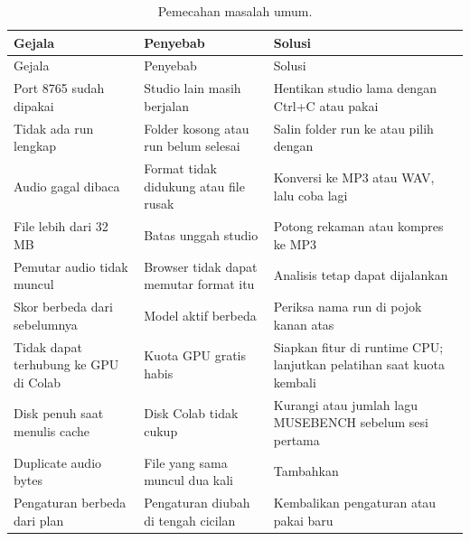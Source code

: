 {\singlespacing\small
\begin{longtable}{L{4.1cm} L{3.8cm} L{4.4cm}}
\caption{Pemecahan masalah umum.}\label{tab:masalah}\\
\toprule
Gejala & Penyebab & Solusi\\
\midrule
\endfirsthead
\toprule
Gejala & Penyebab & Solusi\\
\midrule
\endhead
\bottomrule
\endfoot
Port 8765 sudah dipakai & Studio lain masih berjalan & Hentikan studio lama dengan Ctrl+C atau pakai \\
Tidak ada run lengkap & Folder  kosong atau run belum selesai & Salin folder run ke  atau pilih dengan \\
Audio gagal dibaca & Format tidak didukung atau file rusak & Konversi ke MP3 atau WAV, lalu coba lagi\\
File lebih dari 32 MB & Batas unggah studio & Potong rekaman atau kompres ke MP3\\
Pemutar audio tidak muncul & Browser tidak dapat memutar format itu & Analisis tetap dapat dijalankan\\
Skor berbeda dari sebelumnya & Model aktif berbeda & Periksa nama run di pojok kanan atas\\
Tidak dapat terhubung ke GPU di Colab & Kuota GPU gratis habis & Siapkan fitur di runtime CPU; lanjutkan pelatihan saat kuota kembali\\
Disk penuh saat menulis cache & Disk Colab tidak cukup & Kurangi  atau jumlah lagu MUSEBENCH sebelum sesi pertama\\
Duplicate audio bytes & File yang sama muncul dua kali & Tambahkan \\
Pengaturan berbeda dari plan & Pengaturan diubah di tengah cicilan & Kembalikan pengaturan atau pakai  baru\\
\end{longtable}}

